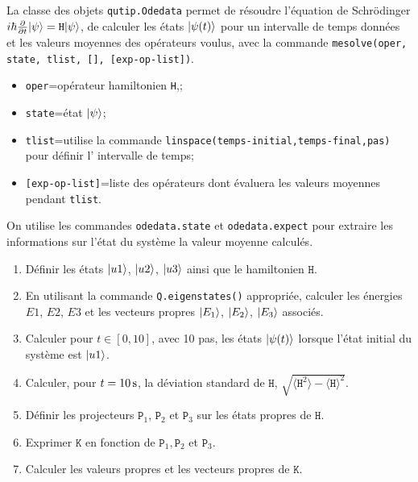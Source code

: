 \begin{itemize}
La classe des objets \texttt{qutip.Odedata} permet de résoudre l'équation de 
Schr\"odinger $i\hbar\frac{\partial}{\partial t}\vert\psi\rangle=\mathtt{H} 
\vert\psi\rangle$, de calculer les états $\vert\psi(t)\rangle$ pour un intervalle de temps 
données et les valeurs moyennes des opérateurs voulus, avec la commande 
\texttt{mesolve(oper, state, tlist, [], [exp-op-list])}.
\begin{itemize}
 \item \texttt{oper}=opérateur hamiltonien \texttt{H},;
 \item \texttt{state}=état $\vert\psi\rangle$;
  \item \texttt{tlist}=utilise la commande
\texttt{linspace(temps-initial,temps-final,pas)} pour définir l' intervalle de
temps;
\item \texttt{[exp-op-list]}=liste des opérateurs dont évaluera les valeurs
moyennes pendant \texttt{tlist}.
\end{itemize}
On utilise les commandes \texttt{odedata.state} et \texttt{odedata.expect} pour
extraire les informations sur l'état du système la valeur moyenne calculés.

\begin{enumerate}
\item Définir les états $\vert u1\rangle$, $\vert u2\rangle$, $\vert u3\rangle$ ainsi que le
hamiltonien $\mathtt{H}$.

\item En utilisant la commande \texttt{Q.eigenstates()} appropriée, calculer
les énergies $E1$, $E2$, $E3$ et les vecteurs propres $\vert E_1\rangle$, $\vert E_2\rangle$,
$\vert E_3\rangle$ associés.

\item Calculer pour $t\in[0,10]$, avec 10 pas, les états $\vert\psi(t)\rangle$
lorsque l'état initial du système est $\vert u1\rangle$.

\item Calculer, pour $t=10\operatorname{s}$, la déviation standard de $\mathtt{H}$,
$\sqrt{\langle\mathtt{H}^2\rangle-\langle\mathtt{H}\rangle^2}$.

\item Définir les projecteurs $\mathtt{P}_1$, $\mathtt{P}_2$ et $\mathtt{P}_3$ 
sur les états propres de
$\mathtt{H}$.

\item Exprimer $\mathtt{K}$ en fonction de $\mathtt{P}_1,\mathtt{P}_2$ et 
$\mathtt{P}_3$.

\item Calculer les valeurs propres et les vecteurs propres de $\mathtt{K}$.


\end{enumerate}
\end{itemize}
